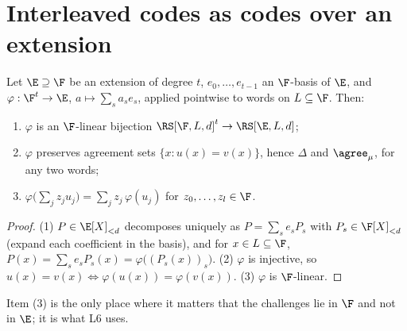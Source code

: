 \section{Interleaved codes as codes over an extension}

\setcounter{lemma}{4}\begin{lemma}[Interleaved code $=$ extension-field code]\label{lem:ext}
Let $\E\supseteq\F$ be an extension of degree $t$, $e_0,\dots,e_{t-1}$ an $\F$-basis of
$\E$, and $\varphi:\F^t\to\E$, $a\mapsto\sum_s a_se_s$, applied pointwise to words on
$L\subseteq\F$. Then:
\begin{enumerate}
\item $\varphi$ is an $\F$-linear bijection $\RS[\F,L,d]^t\to\RS[\E,L,d]$;
\item $\varphi$ preserves agreement sets $\{x:u(x)=v(x)\}$, hence $\Delta$ and
$\agree_\mu$, for any two words;
\item $\varphi\big(\sum_j z_ju_j\big)=\sum_j z_j\,\varphi(u_j)$ for $z_0,\dots,z_l\in\F$.
\end{enumerate}
\end{lemma}

\begin{proof}
(1) $P\in\E[X]_{<d}$ decomposes uniquely as $P=\sum_s e_sP_s$ with
$P_s\in\F[X]_{<d}$ (expand each coefficient in the basis), and for $x\in L\subseteq\F$,
$P(x)=\sum_s e_sP_s(x)=\varphi\big((P_s(x))_s\big)$.
(2) $\varphi$ is injective, so $u(x)=v(x)\iff\varphi(u(x))=\varphi(v(x))$.
(3) $\varphi$ is $\F$-linear.
\end{proof}

\begin{remark}
Item (3) is the only place where it matters that the challenges lie in $\F$ and not in
$\E$; it is what L6 uses.
\end{remark}
